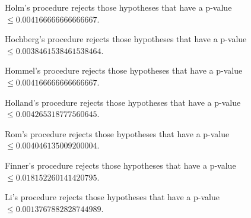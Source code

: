 \documentclass[a4paper,10pt]{article}
\begin{document}
\begin{landscape}
Holm's procedure rejects those hypotheses that have a p-value $\le0.004166666666666667$.


Hochberg's procedure rejects those hypotheses that have a p-value $\le0.0038461538461538464$.


Hommel's procedure rejects those hypotheses that have a p-value $\le0.004166666666666667$.


Holland's procedure rejects those hypotheses that have a p-value $\le0.004265318777560645$.


Rom's procedure rejects those hypotheses that have a p-value $\le0.004046135009200004$.


Finner's procedure rejects those hypotheses that have a p-value $\le0.018152260141420795$.


Li's procedure rejects those hypotheses that have a p-value $\le0.0013767882828744989$.



\newpage


\end{landscape}
\end{document}
